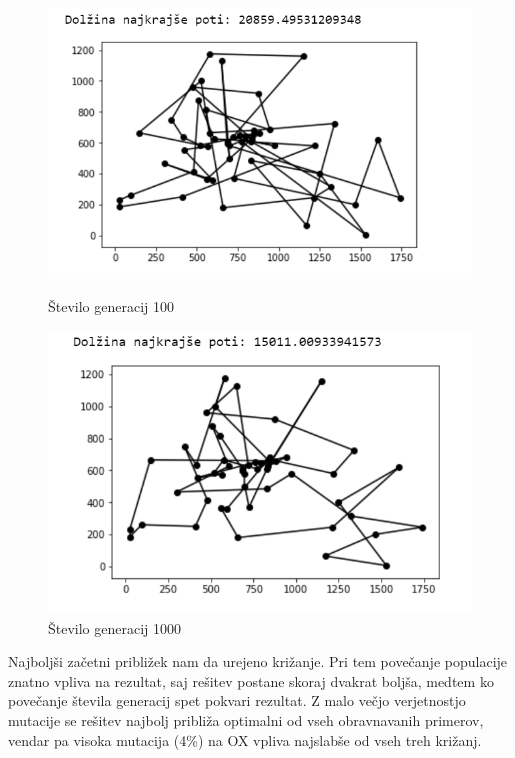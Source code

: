 \documentclass[12pt,a4paper]{amsart}
\theoremstyle{definition} %
\theoremstyle{plain} %
\begin{document}
\begin{figure}[h!]
\begin{minipage}[t]{0.48\textwidth}
\includegraphics[width=\linewidth,keepaspectratio=true]{primer-pop1}
\caption{Število generacij 100}
\label{gem1}
\end{minipage}
\hspace*{\fill} %
\begin{minipage}[t]{0.48\textwidth}
\includegraphics[width=\linewidth,keepaspectratio=true]{primer-pop-gen3}
\caption{Število generacij 1000}
\label{gen2}
\end{minipage}
\end{figure}
\newpage
Najboljši začetni približek nam da urejeno križanje. Pri tem povečanje populacije znatno vpliva na rezultat, saj rešitev postane skoraj dvakrat boljša, medtem ko povečanje števila generacij spet pokvari rezultat. Z malo večjo verjetnostjo mutacije se rešitev najbolj približa optimalni od vseh obravnavanih primerov, vendar pa visoka mutacija (4\%) na OX vpliva najslabše od vseh treh križanj. 
\end{document}
